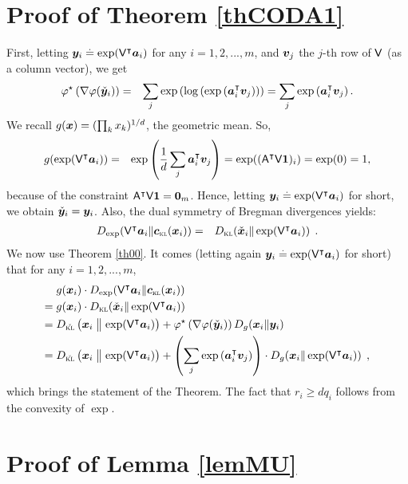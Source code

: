 \section{Proof of Theorem \ref{thCODA1}}\label{sec-proof-thCODA1}

First,
letting $\bm{y}_i \stackrel{\mathrm{.}}{=} \exp(\mathsf{V}^\intercal \bm{a}_i)$ for any $i = 1, 2, ...,
m$, and $\bm{v}_j$ the $j$-th row of $\mathsf{V}$ (as a column vector), we get
\begin{eqnarray}
\varphi^\star\left(\nabla\varphi(\check{\bm{y}}_i)\right) & = & \sum_j
\exp\left( \log \left( \exp\left( \bm{a}^\intercal_i
      \bm{v}_j\right)\right)\right) = \sum_j
\exp\left(\bm{a}^\intercal_i
      \bm{v}_j\right)\label{eq1}.
\end{eqnarray}
We recall $g(\bm{x}) =
(\prod_k x_k)^{1/d}$, the geometric mean. So,
\begin{eqnarray}
g(\exp(\mathsf{V}^\intercal \bm{a}_i)) & = & \exp\left(\frac{1}{d} \sum_j \bm{a}^\intercal_i
      \bm{v}_j\right) = \exp((\mathsf{A}^\intercal \mathsf{V} \bm{1})_i) = \exp(0) = 1,
\end{eqnarray}
because of the constraint $\mathsf{A}^\intercal \mathsf{V} \bm{1} = \bm{0}_m$. Hence,
letting $\bm{y}_i \stackrel{\mathrm{.}}{=} \exp(\mathsf{V}^\intercal \bm{a}_i)$ for short, we obtain
$\check{\bm{y}}_i = \bm{y}_i$. Also, the dual symmetry of Bregman
divergences \citep{bnnBV} yields:
\begin{eqnarray}
D_{\exp}(\V^\top \ve{a}_i \|\clrlog({\ve{x}_i})) & = & D_{\kl} (\check{\ve{x}}_i \|
\exp(\V^\top \ve{a}_i))\:\:.
\end{eqnarray}
We now use Theorem \ref{th00}. It comes (letting again $\bm{y}_i \stackrel{\mathrm{.}}{=} \exp(\mathsf{V}^\intercal \bm{a}_i)$ for
short) that for any $i=1, 2, ..., m$,
\begin{align}
&g(\ve{x}_i) \cdot D_{\exp}(\V^\top \ve{a}_i\|\clrlog({\ve{x}_i}))\nonumber\\
=\;&   g(\ve{x}_i) \cdot D_{\kl} (\check{\ve{x}}_i \|
\exp(\V^\top \ve{a}_i))\nonumber\\
=\;&  D_{\check{\kl}}\left( \ve{x}_i \bigm\|
  \exp(\V^\top \ve{a}_i)\right) +
\varphi^\star\left(\nabla\varphi(\veydagger_i)\right) D_{g}(\ve{x}_i
\| \ve{y}_i)\nonumber\\
=\;&  D_{\check{\kl}}\left( \ve{x}_i \bigm\|
  \exp(\V^\top \ve{a}_i)\right) +
\left(\sum_j
\exp\left(\ve{a}^\top_i
      \ve{v}_j\right)\right)\cdot D_{g}(\ve{x}_i
\| \exp(\V^\top \ve{a}_i))\:\:,
\end{align}
which brings the statement of the Theorem. The fact that $r_i \geq d
q_i$ follows from the convexity of $\exp$.

\section{Proof of Lemma \ref{lemMU}}\label{sec-proof-lemMU}

